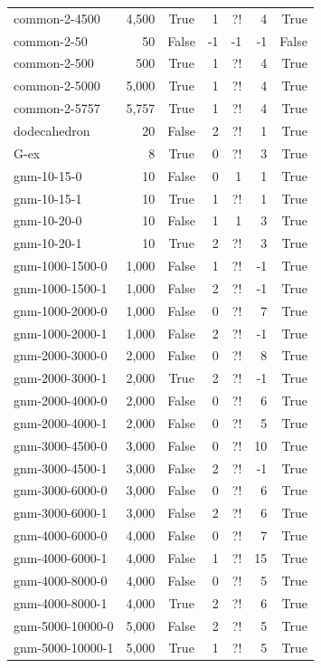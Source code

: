 \begin{table}[ht]
\begin{tabular}{l r c r r r r}
common-2-4500 & 4,500 & True & 1 & ?! & 4 & True \\
common-2-50 & 50 & False & -1 & -1 & -1 & False \\
common-2-500 & 500 & True & 1 & ?! & 4 & True \\
common-2-5000 & 5,000 & True & 1 & ?! & 4 & True \\
common-2-5757 & 5,757 & True & 1 & ?! & 4 & True \\
dodecahedron & 20 & False & 2 & ?! & 1 & True \\
G-ex & 8 & True & 0 & ?! & 3 & True \\
gnm-10-15-0 & 10 & False & 0 & 1 & 1 & True \\
gnm-10-15-1 & 10 & True & 1 & ?! & 1 & True \\
gnm-10-20-0 & 10 & False & 1 & 1 & 3 & True \\
gnm-10-20-1 & 10 & True & 2 & ?! & 3 & True \\
gnm-1000-1500-0 & 1,000 & False & 1 & ?! & -1 & True \\
gnm-1000-1500-1 & 1,000 & False & 2 & ?! & -1 & True \\
gnm-1000-2000-0 & 1,000 & False & 0 & ?! & 7 & True \\
gnm-1000-2000-1 & 1,000 & False & 2 & ?! & -1 & True \\
gnm-2000-3000-0 & 2,000 & False & 0 & ?! & 8 & True \\
gnm-2000-3000-1 & 2,000 & True & 2 & ?! & -1 & True \\
gnm-2000-4000-0 & 2,000 & False & 0 & ?! & 6 & True \\
gnm-2000-4000-1 & 2,000 & False & 0 & ?! & 5 & True \\
gnm-3000-4500-0 & 3,000 & False & 0 & ?! & 10 & True \\
gnm-3000-4500-1 & 3,000 & False & 2 & ?! & -1 & True \\
gnm-3000-6000-0 & 3,000 & False & 0 & ?! & 6 & True \\
gnm-3000-6000-1 & 3,000 & False & 2 & ?! & 6 & True \\
gnm-4000-6000-0 & 4,000 & False & 0 & ?! & 7 & True \\
gnm-4000-6000-1 & 4,000 & False & 1 & ?! & 15 & True \\
gnm-4000-8000-0 & 4,000 & False & 0 & ?! & 5 & True \\
gnm-4000-8000-1 & 4,000 & True & 2 & ?! & 6 & True \\
gnm-5000-10000-0 & 5,000 & False & 2 & ?! & 5 & True \\
gnm-5000-10000-1 & 5,000 & True & 1 & ?! & 5 & True \\

\end{tabular}
\end{table}
